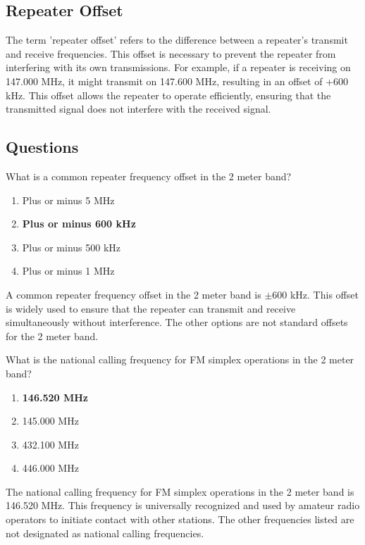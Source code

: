 \subsection*{Repeater Offset}
The term 'repeater offset' refers to the difference between a repeater's transmit and receive frequencies. This offset is necessary to prevent the repeater from interfering with its own transmissions. For example, if a repeater is receiving on 147.000 MHz, it might transmit on 147.600 MHz, resulting in an offset of +600 kHz. This offset allows the repeater to operate efficiently, ensuring that the transmitted signal does not interfere with the received signal.

\subsection*{Questions}

\begin{tcolorbox}[colback=gray!10!white,colframe=black!75!black,title={T2A01}]
What is a common repeater frequency offset in the 2 meter band?
\begin{enumerate}[label=\Alph*,noitemsep]
    \item Plus or minus 5 MHz
    \item \textbf{Plus or minus 600 kHz}
    \item Plus or minus 500 kHz
    \item Plus or minus 1 MHz
\end{enumerate}
\end{tcolorbox}
A common repeater frequency offset in the 2 meter band is $\pm 600$ kHz. This offset is widely used to ensure that the repeater can transmit and receive simultaneously without interference. The other options are not standard offsets for the 2 meter band.

\begin{tcolorbox}[colback=gray!10!white,colframe=black!75!black,title={T2A02}]
What is the national calling frequency for FM simplex operations in the 2 meter band?
\begin{enumerate}[label=\Alph*,noitemsep]
    \item \textbf{146.520 MHz}
    \item 145.000 MHz
    \item 432.100 MHz
    \item 446.000 MHz
\end{enumerate}
\end{tcolorbox}
The national calling frequency for FM simplex operations in the 2 meter band is 146.520 MHz. This frequency is universally recognized and used by amateur radio operators to initiate contact with other stations. The other frequencies listed are not designated as national calling frequencies.

